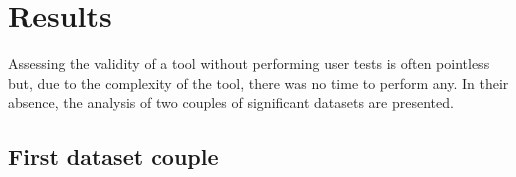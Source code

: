 \chapter{Results}

Assessing the validity of a tool without performing user tests is often pointless but, due to the complexity of the tool, there was no time to perform any. In their absence, the analysis of two couples of significant datasets are presented.

\section{First dataset couple}

